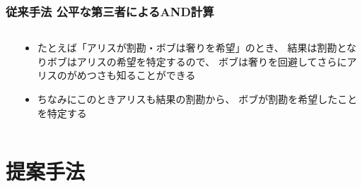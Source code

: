 \begin{frame}
  \frametitle{従来手法 公平な第三者によるAND計算}

  \begin{columns}
    \begin{column}{0.6\textwidth}

    \end{column}
    \begin{column}{0.4\textwidth}
      \begin{itemize}
        \item たとえば「アリスが割勘・ボブは奢りを希望」のとき、
        結果は割勘となりボブはアリスの希望を特定するので、
        ボブは奢りを回避してさらにアリスのがめつさも知ることができる

        \item ちなみにこのときアリスも結果の割勘から、
        ボブが割勘を希望したことを特定する
      \end{itemize}
    \end{column}
  \end{columns}
\end{frame}

\section{提案手法}

